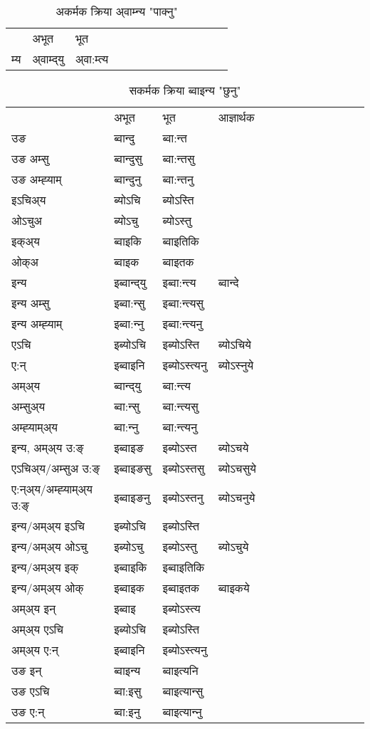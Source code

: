 \begin{table}[H]
\centering
\caption{\label{omt.vt} अकर्मक क्रिया  अ्वाम्‍न्य  "पाक्नु"  }
\begin{tabular}{l|l|l|l|l|l|l|l|l|l|l|l|l}  \toprule
&अभूत & भूत   \\ 
म्य & अ्वाम्द्‌यु  & अ्वा:म्त्य  \\ 
\bottomrule
\end{tabular}
\end{table}


\begin{table}[H]
\centering
\caption{\label{ont.vt} सकर्मक क्रिया  ब्वाइन्य  "छुनु"  }
\begin{tabular}{l|l|l|l|l|l|l|l|l|l|l|l|l}  \toprule
&अभूत & भूत & आज्ञार्थक \\ 
उङ &ब्वान्दु &ब्वा:न्त \\ 
उङ अम्सु&ब्वान्दुसु &ब्वा:न्तसु \\ 
उङ अम्ह्‍याम्&ब्वान्दुनु &ब्वा:न्तनु \\ 
इऽचिअ्य &ब्योऽचि &ब्योऽस्ति   \\ 
ओऽचुअ        &ब्योऽचु &ब्योऽस्तु   \\ 
इक्अ्य&ब्वाइकि &ब्वाइतिकि   \\ 
ओक्अ &ब्वाइक &ब्वाइतक   \\ 
इन्य & इब्वान्द्‌यु  & इब्वा:न्त्य &ब्वान्दे  \\ 
इन्य अम्सु& इब्वा:न्सु  & इब्वा:न्त्यसु   \\ 
इन्य अम्ह्‍याम्& इब्वा:न्‍नु  & इब्वा:न्त्यनु   \\ 
एऽचि & इब्योऽचि & इब्योऽस्ति &ब्योऽचिये    \\ 
ए:न् & इब्वाइनि  & इब्योऽस्त्यनु &ब्योऽस्‍नुये  \\ 
अम्अ्य & ब्वान्द्‌यु  & ब्वा:न्त्य  \\ 
अम्सुअ्य & ब्वा:न्सु & ब्वा:न्त्यसु  \\ 
अम्ह्‍याम्अ्य & ब्वा:न्‍नु  & ब्वा:न्त्यनु \\ 
\midrule
इन्य, अम्अ्य उ:ङ्‌ &इब्वाइङ &इब्योऽस्त &ब्योऽचये \\ 
एऽचिअ्य/अम्सुअ उ:ङ्‌ &इब्वाइङसु &इब्योऽस्तसु &ब्योऽचसुये \\ 
ए:न्अ्य/अम्ह्‍याम्अ्य उ:ङ्‌ &इब्वाइङनु &इब्योऽस्तनु &ब्योऽचनुये \\ 
इन्य/अम्अ्य इऽचि &इब्योऽचि &इब्योऽस्ति    \\ 
इन्य/अम्अ्य ओऽचु &इब्योऽचु &इब्योऽस्तु  &ब्योऽचुये  \\ 
इन्य/अम्अ्य इक् &इब्वाइकि &इब्वाइतिकि   \\ 
इन्य/अम्अ्य ओक् &इब्वाइक &इब्वाइतक  &ब्वाइकये  \\ 
अम्अ्य इन् & इब्वाइ & इब्योऽस्त्य   \\ 
अम्अ्य एऽचि & इब्योऽचि & इब्योऽस्ति    \\ 
अम्अ्य ए:न् & इब्वाइनि  & इब्योऽस्त्यनु  \\ 
\midrule
उङ इन् & ब्वाइन्य  & ब्वाइत्यनि  \\ 
उङ एऽचि & ब्वा:इसु  & ब्वाइत्यान्सु   \\ 
उङ ए:न्& ब्वा:इनु  & ब्वाइत्यान्‍नु   \\ 
\bottomrule
\end{tabular}
\end{table}


